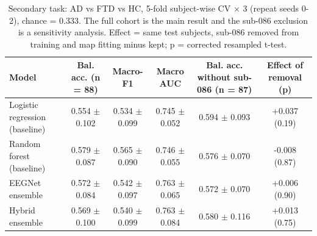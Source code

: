 \begin{table}[!t]
\centering
\footnotesize
\caption{Secondary task: AD vs FTD vs HC, 5-fold subject-wise CV $\times$ 3 (repeat seeds 0-2), chance = 0.333. The full cohort is the main result and the sub-086 exclusion is a sensitivity analysis. Effect = same test subjects, sub-086 removed from training and map fitting minus kept; p = corrected resampled t-test.}
\label{tab:table5_three_class}
\begin{tabular}{lccccc}
\toprule
Model & Bal. acc. (n = 88) & Macro-F1 & Macro AUC & Bal. acc. without sub-086 (n = 87) & Effect of removal (p) \\
\midrule
Logistic regression (baseline) & 0.554 $\pm$ 0.102 & 0.534 $\pm$ 0.099 & 0.745 $\pm$ 0.052 & 0.594 $\pm$ 0.093 & +0.037 (0.19) \\
Random forest (baseline) & 0.579 $\pm$ 0.087 & 0.565 $\pm$ 0.090 & 0.746 $\pm$ 0.055 & 0.576 $\pm$ 0.070 & -0.008 (0.87) \\
EEGNet ensemble & 0.572 $\pm$ 0.084 & 0.542 $\pm$ 0.097 & 0.763 $\pm$ 0.065 & 0.572 $\pm$ 0.070 & +0.006 (0.90) \\
Hybrid ensemble & 0.569 $\pm$ 0.100 & 0.540 $\pm$ 0.099 & 0.763 $\pm$ 0.084 & 0.580 $\pm$ 0.116 & +0.013 (0.75) \\
\bottomrule
\end{tabular}
\end{table}
